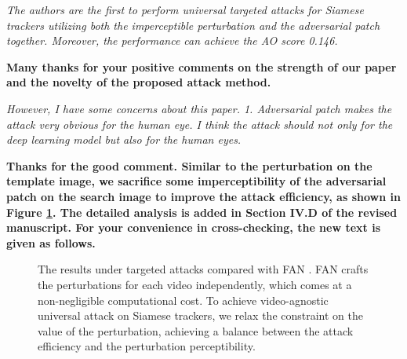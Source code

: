 \documentclass[12pt]{article}
\begin{document}
\newpage
\textit{The authors are the first to perform universal targeted attacks for Siamese trackers utilizing both the imperceptible perturbation and the adversarial patch together. Moreover, the performance can achieve the AO score 0.146.}

\textbf{Many thanks for your positive comments on the strength of our paper and the novelty of the proposed attack method.}

\textit{However, I have some concerns about this paper. 1. Adversarial patch makes the attack very obvious for the human eye. I think the attack should not only for the deep learning model but also for the human eyes.}

\textbf{
Thanks for the good comment. Similar to the perturbation on the template image, we sacrifice some imperceptibility of the adversarial patch on the search image to improve the attack efficiency, as shown in Figure \ref{fig:vis}. 
The detailed analysis is added in Section IV.D of the revised manuscript. For your convenience in cross-checking, the new text is given as follows.
}

\begin{figure}[h]
    \centering
    \caption{The results under targeted attacks compared with FAN \cite{FAN}.  FAN crafts the perturbations for each video independently, which comes at a non-negligible computational cost. To achieve video-agnostic universal attack on Siamese trackers, we relax the constraint on the value of the perturbation, achieving a balance between the attack efficiency and the perturbation perceptibility.}
    \label{fig:vis}
\end{figure}
\end{document}
